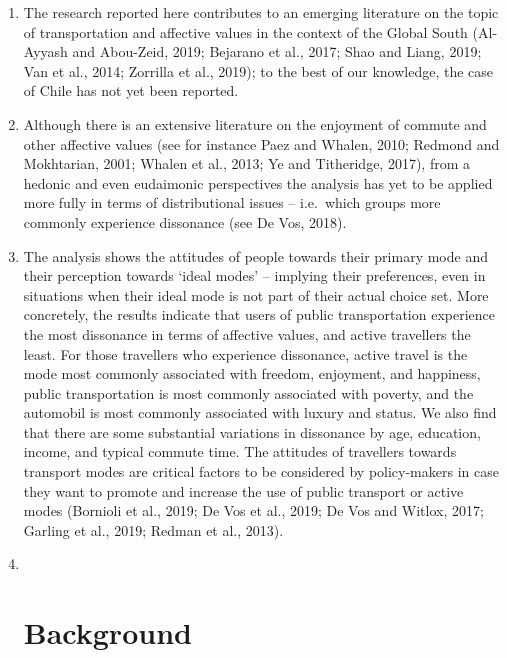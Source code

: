 \documentclass[]{elsarticle} %
\begin{document}
\begin{enumerate}
\def\labelenumi{\arabic{enumi}.}
\item
  The research reported here contributes to an emerging literature on
  the topic of transportation and affective values in the context of the
  Global South (Al-Ayyash and Abou-Zeid, 2019; Bejarano et al., 2017;
  Shao and Liang, 2019; Van et al., 2014; Zorrilla et al., 2019); to the
  best of our knowledge, the case of Chile has not yet been reported.
\item
  Although there is an extensive literature on the enjoyment of commute
  and other affective values (see for instance Paez and Whalen, 2010;
  Redmond and Mokhtarian, 2001; Whalen et al., 2013; Ye and Titheridge,
  2017), from a hedonic and even eudaimonic perspectives the analysis
  has yet to be applied more fully in terms of distributional issues --
  i.e.~which groups more commonly experience dissonance (see De Vos,
  2018).
\item
  The analysis shows the attitudes of people towards their primary mode
  and their perception towards `ideal modes' -- implying their
  preferences, even in situations when their ideal mode is not part of
  their actual choice set. More concretely, the results indicate that
  users of public transportation experience the most dissonance in terms
  of affective values, and active travellers the least. For those
  travellers who experience dissonance, active travel is the mode most
  commonly associated with freedom, enjoyment, and happiness, public
  transportation is most commonly associated with poverty, and the
  automobil is most commonly associated with luxury and status. We also
  find that there are some substantial variations in dissonance by age,
  education, income, and typical commute time. The attitudes of
  travellers towards transport modes are critical factors to be
  considered by policy-makers in case they want to promote and increase
  the use of public transport or active modes (Bornioli et al., 2019; De
  Vos et al., 2019; De Vos and Witlox, 2017; Garling et al., 2019;
  Redman et al., 2013).
\item ~
  \hypertarget{background}{%
  \section{Background}\label{background}}
\end{enumerate}
\end{document}
